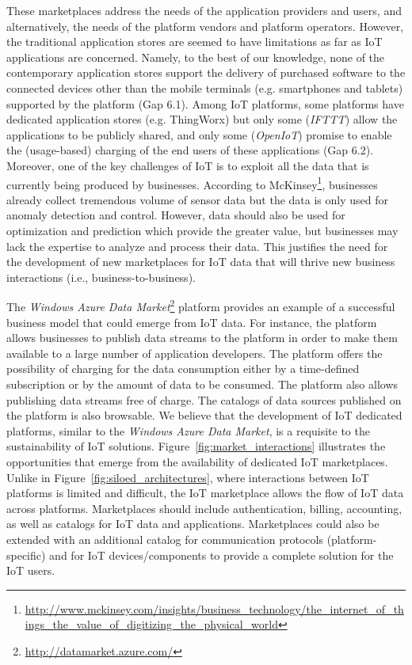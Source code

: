 \documentclass[preprint,10pt,5p]{elsarticle}
\begin{document}
These marketplaces address the needs of the application providers and
users, and alternatively, the needs of the platform vendors and
platform operators.
However, the traditional application stores are seemed to have limitations as far as
IoT applications are concerned. 
Namely, to the best of our knowledge, none of the contemporary application
stores support the delivery of purchased software to the connected devices other
than the mobile terminals (e.g. smartphones and tablets) supported by the
platform (Gap 6.1). 
Among IoT platforms, some platforms have dedicated application stores (e.g. 
ThingWorx) but only some (\emph{IFTTT}) allow the applications to be
publicly shared, and only some (\emph{OpenIoT}) promise to enable the
(usage-based) charging of the end users of these applications (Gap 6.2).
Moreover, one of the key challenges of IoT is to exploit all the data that is currently
being produced by businesses.
According to McKinsey\footnote{\url{http://www.mckinsey.com/insights/business_technology/the_internet_of_things_the_value_of_digitizing_the_physical_world}},
businesses already collect tremendous volume of sensor data
but the data is only used for anomaly detection and control. 
However, data should also be used for optimization and prediction which provide the greater value, 
but businesses may lack the expertise to analyze and process their data.
This justifies the need for the development of new marketplaces for IoT
data that will thrive new business interactions (i.e., business-to-business).

The \emph{Windows Azure Data Market}\footnote{
\url{http://datamarket.azure.com/}} platform provides an example of a successful 
business model that could emerge from IoT data.
For instance, the platform allows businesses to publish data streams to the 
platform in order to make them available to a large number of application 
developers.
The platform offers the possibility of charging for the data consumption either 
by a time-defined subscription or by the amount of data to be consumed. 
The platform also allows publishing data streams free of charge.
The catalogs of data sources published on the platform is also browsable. 
We believe that the development of IoT dedicated platforms, similar to the
\emph{Windows Azure Data Market}, is a requisite to the sustainability of IoT
solutions. 
Figure~\ref{fig:market_interactions} illustrates the opportunities that emerge from the availability of dedicated IoT marketplaces.
Unlike in Figure~\ref{fig:siloed_architectures}, where interactions between IoT platforms is limited and difficult, the IoT marketplace allows the flow of IoT data across platforms.
Marketplaces should include authentication, billing, accounting,
as well as catalogs for IoT data and applications. 
Marketplaces could also be extended with an additional catalog for communication 
protocols (platform-specific) and for IoT devices/components to provide a complete 
solution for the IoT users.
\end{document}
